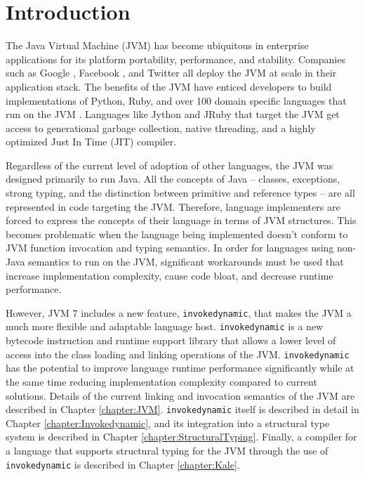 \chapter{Introduction}
\label{Intro}
\lhead{ \leftmark }

The Java Virtual Machine (JVM) has become ubiquitous in enterprise applications for its platform portability, performance, and stability.  Companies such as Google \cite{google-jvm}, Facebook \cite{facebook-hbase}, and Twitter \cite{java-at-twitter} all deploy the JVM at scale in their application stack.  The benefits of the JVM have enticed developers to build implementations of Python, Ruby, and over 100 domain specific languages that run on the JVM \cite{jvm-lang-summit}.  Languages like Jython and JRuby that target the JVM get access to generational garbage collection, native threading, and a highly optimized Just In Time (JIT) compiler.  

Regardless of the current level of adoption of other languages, the JVM was designed primarily to run Java.  All the concepts of Java -- classes, exceptions, strong typing, and the distinction between primitive and reference types -- are all represented in code targeting the JVM.  Therefore, language implementers are forced to express the concepts of their language in terms of JVM structures.  This becomes problematic when the language being implemented doesn't conform to JVM function invocation and typing semantics.  In order for languages using non-Java semantics to run on the JVM, significant workarounds must be used that increase implementation complexity, cause code bloat, and decrease runtime performance.

However, JVM 7 includes a new feature, \texttt{invokedynamic}, that makes the JVM a much more flexible and adaptable language host.  \texttt{invokedynamic} is a new bytecode instruction and runtime support library that allows a lower level of access into the class loading and linking operations of the JVM.  \texttt{invokedynamic} has the potential to improve language runtime performance significantly while at the same time reducing implementation complexity compared to current solutions.  Details of the current linking and invocation semantics of the JVM are described in Chapter \ref{chapter:JVM}.  \texttt{invokedynamic} itself is described in detail in Chapter \ref{chapter:Invokedynamic}, and its integration into a structural type system is described in Chapter \ref{chapter:StructuralTyping}.  Finally, a compiler for a language that supports structural typing for the JVM through the use of \texttt{invokedynamic} is described in Chapter \ref{chapter:Kale}.


